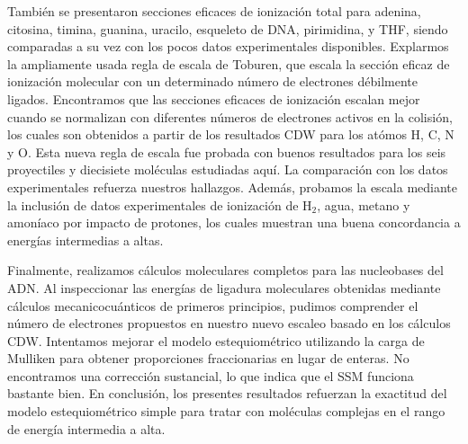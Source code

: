 También se presentaron secciones eficaces de ionización total
para adenina, citosina, timina, guanina, uracilo, esqueleto de DNA, 
pirimidina, y THF, siendo comparadas a su vez con los pocos datos
experimentales disponibles. Explarmos la ampliamente usada regla de 
escala de Toburen, que escala la sección eficaz de ionización molecular 
con un determinado número de electrones débilmente ligados.
Encontramos que las secciones eficaces de ionización escalan
mejor cuando se normalizan con diferentes números de electrones activos
en la colisión, los cuales son obtenidos a partir de los resultados CDW
para los atómos H, C, N y O. Esta nueva regla de escala fue 
probada con buenos resultados para los seis proyectiles y diecisiete 
moléculas estudiadas aquí. La comparación con los datos experimentales 
refuerza nuestros hallazgos. Además, probamos la escala mediante la 
inclusión de datos experimentales de ionización de H$_2$, agua, metano 
y amoníaco por impacto de protones, los cuales muestran una buena 
concordancia a energías intermedias a altas.

Finalmente, realizamos cálculos moleculares completos para las 
nucleobases del ADN. Al inspeccionar las energías de ligadura 
moleculares obtenidas mediante cálculos mecanicocuánticos de primeros 
principios, pudimos comprender el número de electrones propuestos en 
nuestro nuevo escaleo basado en los cálculos CDW. Intentamos mejorar el 
modelo estequiométrico utilizando la carga de Mulliken para obtener 
proporciones fraccionarias en lugar de enteras. No encontramos una 
corrección sustancial, lo que indica que el SSM funciona bastante bien. 
En conclusión, los presentes resultados refuerzan la exactitud del modelo
estequiométrico simple para tratar con moléculas complejas en el rango 
de energía intermedia a alta. 



